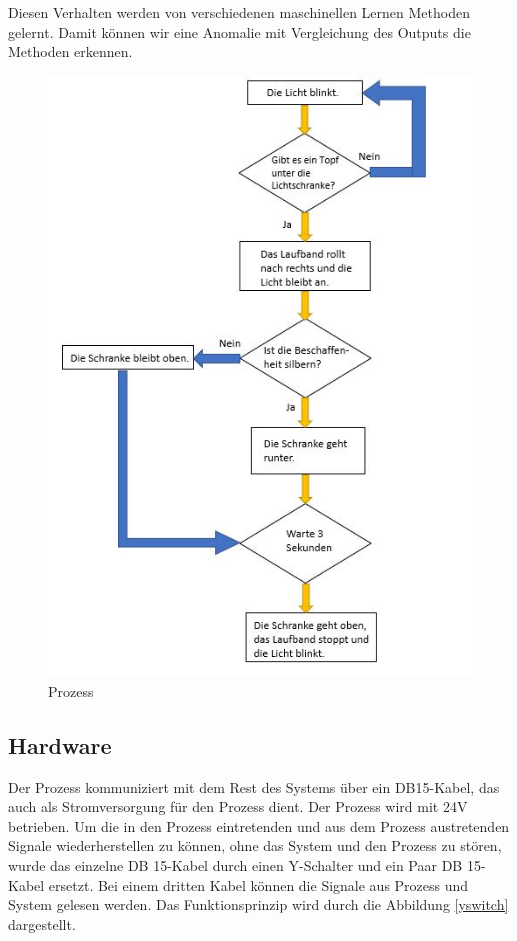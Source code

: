 \documentclass[12pt,a4paper]{scrartcl}
\numberwithin{equation}{section}
\begin{document}
Diesen Verhalten werden von verschiedenen maschinellen Lernen Methoden gelernt. Damit können wir eine Anomalie mit Vergleichung des Outputs die Methoden erkennen.

\begin{figure}[ht!]
	\centering
	  \includegraphics[scale=0.85]{fonctionnement.jpg}
	  \caption{Prozess}
	\label{fonctionnement}
\end{figure}

\subsection{Hardware}

Der Prozess kommuniziert mit dem Rest des Systems über ein DB15-Kabel, das auch als Stromversorgung für den Prozess dient. Der Prozess wird mit 24V betrieben. Um die in den Prozess eintretenden und aus dem Prozess austretenden Signale wiederherstellen zu können, ohne das System und den Prozess zu stören, wurde das einzelne DB 15-Kabel durch einen Y-Schalter und ein Paar DB 15-Kabel ersetzt. Bei einem dritten Kabel können die Signale aus Prozess und System gelesen werden. Das Funktionsprinzip wird durch die Abbildung \ref{yswitch} dargestellt.
\end{document}
